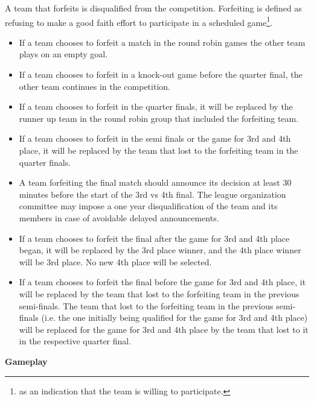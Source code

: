 A team that forfeits is disqualified from the competition. Forfeiting is defined as refusing to make a good faith effort to participate in a scheduled game\footnote{  as an indication that the team is willing to participate.}.
\begin{itemize}
\item If a team chooses to forfeit a match in the round robin games the other team plays on an empty goal.
\item If a team chooses to forfeit in a knock-out game before the quarter final, the other team continues in the competition.
\item If a team chooses to forfeit in the quarter finals, it will be replaced by the runner up team in the round robin group that included the forfeiting team.
\item If a team chooses to forfeit in the semi finals or the game for 3rd and 4th place, it will be replaced by the team that lost to the forfeiting team in the quarter finals.
\item A team forfeiting the final match should announce its decision at least 30 minutes before the start of the 3rd vs 4th final.  The league organization committee may impose a one year disqualification of the team and its members in case of avoidable delayed announcements.
\item If a team chooses to forfeit the final after the game for 3rd and 4th place began, it will be replaced by the 3rd place winner, and the 4th place winner will be 3rd place. No new 4th place will be selected.
\item If a team chooses to forfeit the final before the game for 3rd and 4th place, it will be replaced by the team that lost to the forfeiting team in the previous semi-finals. The team that lost to the forfeiting team in the previous semi-finals (i.e. the one initially being qualified for the game for 3rd and 4th place) will be replaced for the game for 3rd and 4th place by the team that lost to it in the respective quarter final.
\end{itemize}

\bigskip

{\bfseries Gameplay}

\headlinebox


